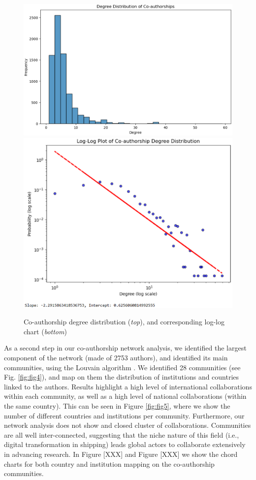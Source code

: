 \documentclass[a4paper, review, endfloat, authoryear]{elsarticle}
\begin{document}
	\begin{figure}[htbp]
		\centering
		\includegraphics[scale=0.8]{pics/coauthorship_degree_distribution.eps}
		\includegraphics[scale=0.8]{pics/coauthorship_degree_distribution_loglog_chart.eps}
		\caption{Co-authorship degree distribution (\textit{top}), and corresponding log-log chart (\textit{bottom})}\label{fig:fig3}
	\end{figure}
	
	As a second step in our co-authorship network analysis, we identified the largest component of the network (made of 2753 authors), and identified its main communities, using the Louvain algorithm \citep{blondel2008fast}. We identified 28 communities (see Fig. \ref{fig:fig4}), and map on them the distribution of institutions and countries linked to the authors. Results highlight a high level of international collaborations within each community, as well as a high level of national collaborations (within the same country). This can be seen in Figure \ref{fig:fig5}, where we show the number of different countries and institutions per community. Furthermore, our network analysis does not show and closed cluster of collaborations. Communities are all well inter-connected, suggesting that the niche nature of this field (i.e., digital transformation in shipping) leads global actors to collaborate extensively in advancing research. In Figure [XXX] and Figure [XXX] we show the chord charts for both country and institution mapping on the co-authorship communities.
	
\end{document}
